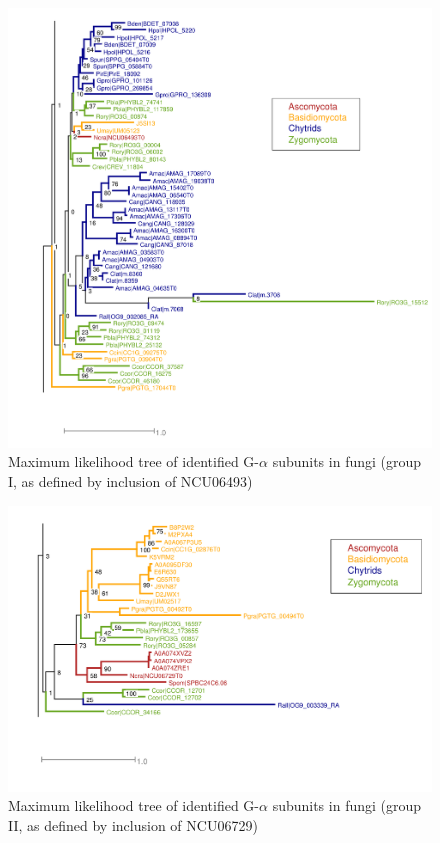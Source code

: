 \begin{figure}[htbp]
  \includegraphics{./Chapter_RhodAux/img/Galpha_tree_grp1.png}
  \caption[G$\alpha$ tree, group 1]{Maximum likelihood tree of identified G-$\alpha$ subunits in fungi (group I, as defined by inclusion of NCU06493)}
  \label{fig:ChRhodA_GalphaTree1}
\end{figure}

\begin{figure}[htbp]
  \includegraphics{./Chapter_RhodAux/img/Galpha_tree_grp2.png}
  \caption[G$\alpha$ tree, group 2]{Maximum likelihood tree of identified G-$\alpha$ subunits in fungi (group II, as defined by inclusion of NCU06729)}
  \label{fig:ChRhodA_GalphaTree2}
\end{figure}

